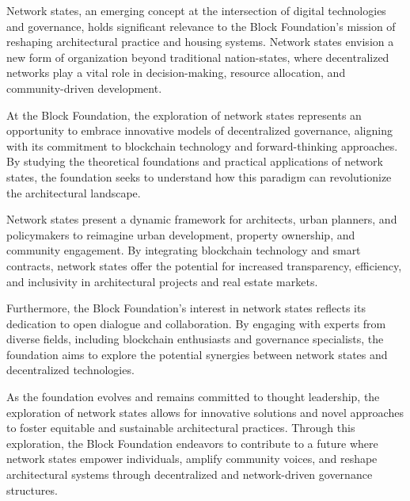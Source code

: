 Network states, an emerging concept at the intersection of digital technologies and governance, holds significant relevance to the Block Foundation's mission of reshaping architectural practice and housing systems. Network states envision a new form of organization beyond traditional nation-states, where decentralized networks play a vital role in decision-making, resource allocation, and community-driven development.

At the Block Foundation, the exploration of network states represents an opportunity to embrace innovative models of decentralized governance, aligning with its commitment to blockchain technology and forward-thinking approaches. By studying the theoretical foundations and practical applications of network states, the foundation seeks to understand how this paradigm can revolutionize the architectural landscape.

Network states present a dynamic framework for architects, urban planners, and policymakers to reimagine urban development, property ownership, and community engagement. By integrating blockchain technology and smart contracts, network states offer the potential for increased transparency, efficiency, and inclusivity in architectural projects and real estate markets.

Furthermore, the Block Foundation's interest in network states reflects its dedication to open dialogue and collaboration. By engaging with experts from diverse fields, including blockchain enthusiasts and governance specialists, the foundation aims to explore the potential synergies between network states and decentralized technologies.

As the foundation evolves and remains committed to thought leadership, the exploration of network states allows for innovative solutions and novel approaches to foster equitable and sustainable architectural practices. Through this exploration, the Block Foundation endeavors to contribute to a future where network states empower individuals, amplify community voices, and reshape architectural systems through decentralized and network-driven governance structures.